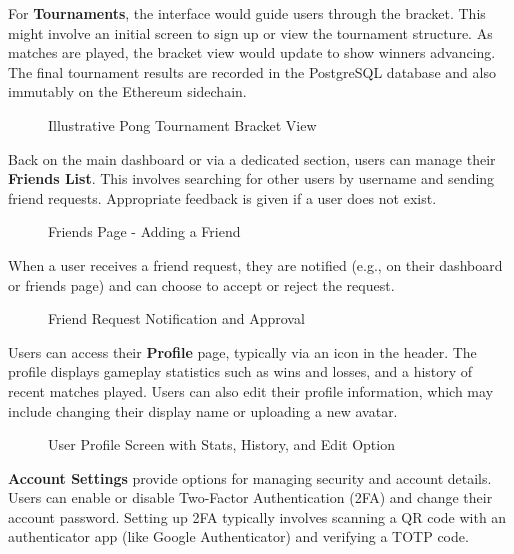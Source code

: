 For \textbf{Tournaments}, the interface would guide users through the bracket. This might involve an initial screen to sign up or view the tournament structure. As matches are played, the bracket view would update to show winners advancing. The final tournament results are recorded in the PostgreSQL database and also immutably on the Ethereum sidechain.

\begin{figure}[H]
    \caption{Illustrative Pong Tournament Bracket View}
    \label{fig:tournament}
\end{figure}

Back on the main dashboard or via a dedicated section, users can manage their \textbf{Friends List}. This involves searching for other users by username and sending friend requests. Appropriate feedback is given if a user does not exist.

\begin{figure}[H]
    \caption{Friends Page - Adding a Friend}
    \label{fig:friends-add}
\end{figure}

When a user receives a friend request, they are notified (e.g., on their dashboard or friends page) and can choose to accept or reject the request.

\begin{figure}[H]
    \caption{Friend Request Notification and Approval}
    \label{fig:friends-request}
\end{figure}

Users can access their \textbf{Profile} page, typically via an icon in the header. The profile displays gameplay statistics such as wins and losses, and a history of recent matches played. Users can also edit their profile information, which may include changing their display name or uploading a new avatar.

\begin{figure}[H]
    \caption{User Profile Screen with Stats, History, and Edit Option}
    \label{fig:profile-page}
\end{figure}

\textbf{Account Settings} provide options for managing security and account details. Users can enable or disable Two-Factor Authentication (2FA) and change their account password. Setting up 2FA typically involves scanning a QR code with an authenticator app (like Google Authenticator) and verifying a TOTP code.

